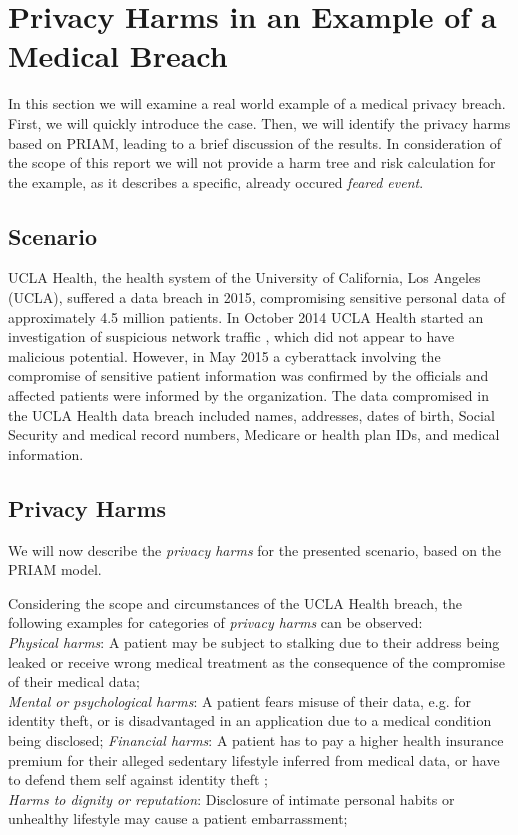 \section{Privacy Harms in an Example of a Medical Breach}
In this section we will examine a real world example of a medical privacy breach. First, we will quickly introduce the case. Then, we will identify the privacy harms based on PRIAM, leading to a brief discussion of the results.  In consideration of the scope of this report we will not provide a harm tree and risk calculation for the example, as it describes a specific, already occured \textit{feared event}.

\subsection{Scenario}
UCLA Health, the health system of the University of California, Los Angeles (UCLA), suffered a data breach in 2015, compromising sensitive personal data of approximately 4.5 million patients. In October 2014 UCLA Health started an investigation of suspicious network traffic , which did not appear to have malicious potential. However, in May 2015 a cyberattack involving the compromise of sensitive patient information was confirmed by the officials and affected patients were informed by the organization. The data compromised in the UCLA Health data breach included names, addresses, dates of birth, Social Security and medical record numbers, Medicare or health plan IDs, and medical information.\cite{uclahealthbreach}

\subsection{Privacy Harms}
We will now describe the \textit{privacy harms} for the presented scenario, based on the PRIAM model\cite[Section 3.7]{de:hal-01302541}.

Considering the scope and circumstances of the UCLA Health breach, the following examples for categories of \textit{privacy harms} can be observed:\\
\textit{Physical harms}: A patient may be subject to stalking due to their address being leaked or receive wrong medical treatment as the consequence of the compromise of their medical data;\\
\textit{Mental or psychological harms}: A patient fears misuse of their data, e.g. for identity theft, or is disadvantaged in an application due to a medical condition being disclosed;
\textit{Financial harms}: A patient has to pay a higher health insurance premium for their alleged sedentary lifestyle inferred from medical data, or have to defend them self against identity theft ;\\
\textit{Harms to dignity or reputation}: Disclosure of intimate personal habits or unhealthy lifestyle may cause a patient embarrassment;

